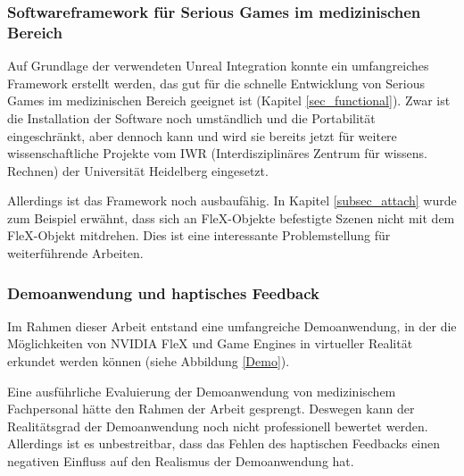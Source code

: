 \subsubsection{Softwareframework für Serious Games im medizinischen Bereich}
Auf Grundlage der verwendeten Unreal Integration konnte ein umfangreiches Framework erstellt  werden, das gut für die schnelle Entwicklung von Serious Games im medizinischen Bereich geeignet ist (Kapitel \ref{sec_functional}). 
Zwar ist die Installation der Software noch umständlich  und die Portabilität eingeschränkt, aber dennoch kann und wird sie bereits jetzt für weitere wissenschaftliche Projekte vom IWR (Interdisziplinäres Zentrum für wissens. Rechnen) der Universität Heidelberg eingesetzt. 

Allerdings ist das Framework noch ausbaufähig. In Kapitel \ref{subsec_attach} wurde zum Beispiel erwähnt, dass sich an FleX-Objekte befestigte Szenen nicht mit dem FleX-Objekt mitdrehen. Dies ist eine interessante Problemstellung für weiterführende Arbeiten.

\subsubsection{Demoanwendung und haptisches Feedback}
Im Rahmen dieser Arbeit entstand eine umfangreiche Demoanwendung, in der die Möglichkeiten von NVIDIA FleX und Game Engines in virtueller Realität erkundet werden können (siehe Abbildung \ref{Demo}). 


Eine ausführliche Evaluierung der Demoanwendung von medizinischem Fachpersonal hätte den Rahmen der Arbeit gesprengt. Deswegen kann der Realitätsgrad der Demoanwendung noch nicht professionell bewertet werden.
Allerdings ist es unbestreitbar, dass das Fehlen des haptischen Feedbacks einen negativen Einfluss auf den Realismus der Demoanwendung hat.

